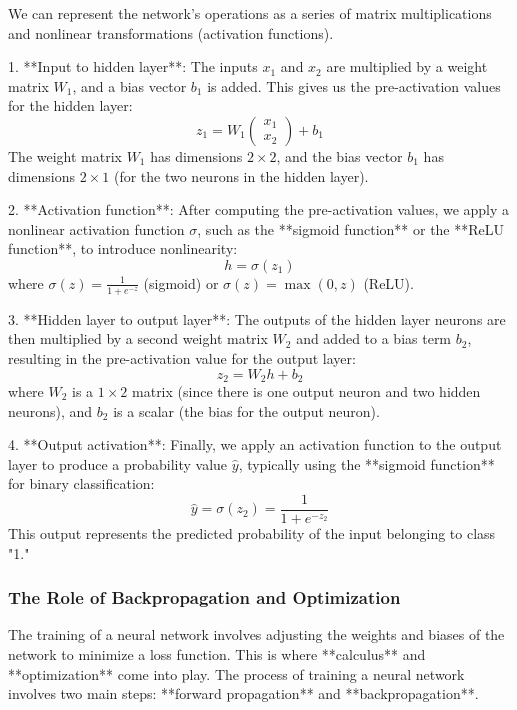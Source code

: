 \documentclass{article}
\begin{document}
We can represent the network's operations as a series of matrix multiplications and nonlinear transformations (activation functions).

1. **Input to hidden layer**: The inputs \( x_1 \) and \( x_2 \) are multiplied by a weight matrix \( W_1 \), and a bias vector \( b_1 \) is added. This gives us the pre-activation values for the hidden layer:
   \[
   z_1 = W_1 \begin{pmatrix} x_1 \\ x_2 \end{pmatrix} + b_1
   \]
   The weight matrix \( W_1 \) has dimensions \( 2 \times 2 \), and the bias vector \( b_1 \) has dimensions \( 2 \times 1 \) (for the two neurons in the hidden layer).

2. **Activation function**: After computing the pre-activation values, we apply a nonlinear activation function \( \sigma \), such as the **sigmoid function** or the **ReLU function**, to introduce nonlinearity:
   \[
   h = \sigma(z_1)
   \]
   where \( \sigma(z) = \frac{1}{1 + e^{-z}} \) (sigmoid) or \( \sigma(z) = \max(0, z) \) (ReLU).

3. **Hidden layer to output layer**: The outputs of the hidden layer neurons are then multiplied by a second weight matrix \( W_2 \) and added to a bias term \( b_2 \), resulting in the pre-activation value for the output layer:
   \[
   z_2 = W_2 h + b_2
   \]
   where \( W_2 \) is a \( 1 \times 2 \) matrix (since there is one output neuron and two hidden neurons), and \( b_2 \) is a scalar (the bias for the output neuron).

4. **Output activation**: Finally, we apply an activation function to the output layer to produce a probability value \( \hat{y} \), typically using the **sigmoid function** for binary classification:
   \[
   \hat{y} = \sigma(z_2) = \frac{1}{1 + e^{-z_2}}
   \]
   This output represents the predicted probability of the input belonging to class "1."

\subsubsection*{The Role of Backpropagation and Optimization}

The training of a neural network involves adjusting the weights and biases of the network to minimize a loss function. This is where **calculus** and **optimization** come into play. The process of training a neural network involves two main steps: **forward propagation** and **backpropagation**.
\end{document}
